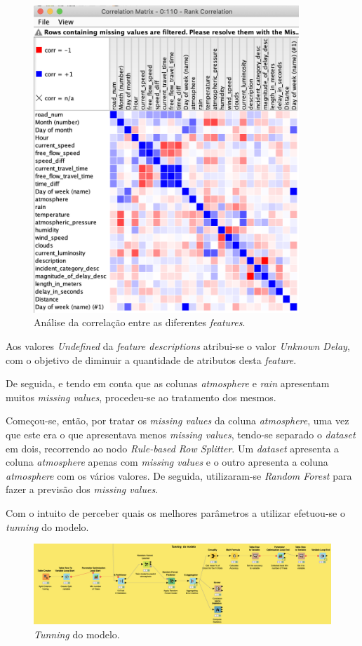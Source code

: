 \documentclass[a4paper, 12pt]{article}
\begin{document}
\begin{figure}[H]
	\centering
	\includegraphics[width=10cm]{rank}
	\caption{Análise da correlação entre as diferentes \textit{features}.}
\end{figure}

Aos valores \textit{Undefined} da \textit{feature descriptions} atribui-se o valor \textit{Unknown Delay}, com o objetivo de diminuir a quantidade de atributos desta \textit{feature}.

De seguida, e tendo em conta que as colunas \textit{atmosphere} e \textit{rain} apresentam muitos \textit{missing values}, procedeu-se ao tratamento dos mesmos. 

Começou-se, então, por tratar os \textit{missing values} da coluna \textit{atmosphere}, uma vez que este era o que apresentava menos \textit{missing values}, tendo-se separado o \textit{dataset} em dois, recorrendo ao nodo \textit{Rule-based Row Splitter}. Um \textit{dataset} apresenta a coluna \textit{atmosphere} apenas com \textit{missing values} e o outro apresenta a coluna \textit{atmosphere} com os vários valores. De seguida, utilizaram-se \textit{Random Forest} para fazer a previsão dos \textit{missing values}.

Com o intuito de perceber quais os melhores parâmetros a utilizar efetuou-se o \textit{tunning} do modelo.

\begin{figure}[H]
	\centering
	\includegraphics[width=15cm]{tunning}
	\caption{\textit{Tunning} do modelo.}
\end{figure}
\end{document}
